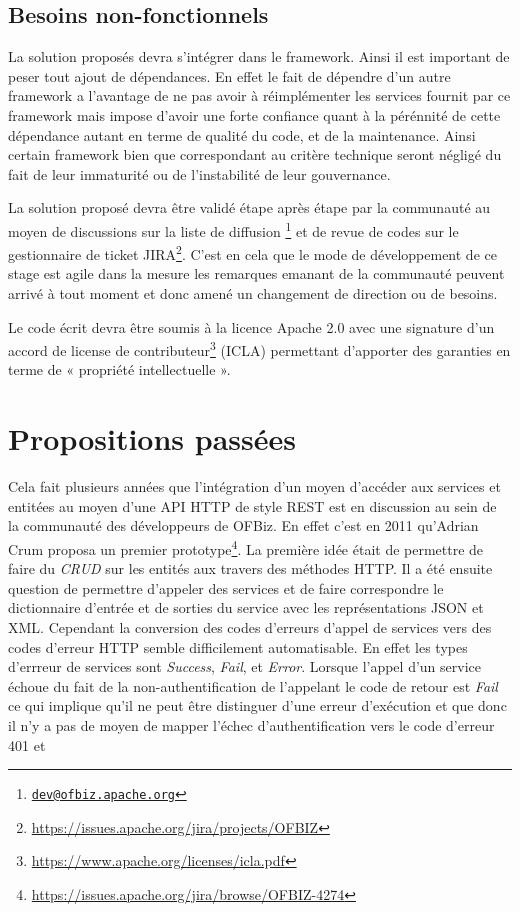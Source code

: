 \documentclass[a4paper, 11pt]{report}
\begin{document}
\subsection{Besoins non-fonctionnels}

La solution proposés devra s'intégrer dans le framework. Ainsi il est
important de peser tout ajout de dépendances.  En effet le fait de
dépendre d'un autre framework a l'avantage de ne pas avoir à
réimplémenter les services fournit par ce framework mais impose
d'avoir une forte confiance quant à la pérénnité de cette dépendance
autant en terme de qualité du code, et de la maintenance.  Ainsi
certain framework bien que correspondant au critère technique seront
négligé du fait de leur immaturité ou de l'instabilité de leur
gouvernance.

La solution proposé devra être validé étape après étape par la
communauté au moyen de discussions sur la liste de diffusion
\footnote{\href{mailto:dev@ofbiz.apache.org}{\nolinkurl{dev@ofbiz.apache.org}}}
et de revue de codes sur le gestionnaire de ticket
JIRA\footnote{\url{https://issues.apache.org/jira/projects/OFBIZ}}. C'est
en cela que le mode de développement de ce stage est agile dans la
mesure les remarques emanant de la communauté peuvent arrivé à tout
moment et donc amené un changement de direction ou de besoins.

Le code écrit devra être soumis à la licence Apache 2.0 avec une
signature d'un accord de license de
contributeur\footnote{\url{https://www.apache.org/licenses/icla.pdf}} (ICLA)
permettant d'apporter des garanties en terme de « propriété
intellectuelle ».

\section{Propositions passées}

Cela fait plusieurs années que l'intégration d'un moyen d'accéder aux
services et entitées au moyen d'une API HTTP de style REST est en
discussion au sein de la communauté des développeurs de OFBiz.  En
effet c'est en 2011 qu'Adrian Crum proposa un premier
prototype\footnote{\url{https://issues.apache.org/jira/browse/OFBIZ-4274}}. La
première idée était de permettre de faire du \emph{CRUD} sur les
entités aux travers des méthodes HTTP.  Il a été ensuite question de
permettre d'appeler des services et de faire correspondre le
dictionnaire d'entrée et de sorties du service avec les
représentations JSON et XML.  Cependant la conversion des codes
d'erreurs d'appel de services vers des codes d'erreur HTTP semble
difficilement automatisable.  En effet les types d'errreur de services
sont \emph{Success}, \emph{Fail}, et \emph{Error}.  Lorsque l'appel
d'un service échoue du fait de la non-authentification de l'appelant
le code de retour est \emph{Fail} ce qui implique qu'il ne peut être
distinguer d'une erreur d'exécution et que donc il n'y a pas de moyen
de mapper l'échec d'authentification vers le code d'erreur 401 et
\end{document}
